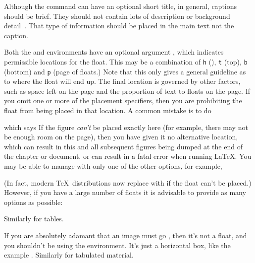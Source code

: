 
Although the  command can have an optional
short title, in general, captions should be brief. They should not
contain lots of description or background detail~\cite{turabian96}.
That type of information should be placed in the main text not the
caption.


\label{obj:positioning}%
Both the 
 and  environments have
an optional argument , which indicates
permissible locations for the float. This may be a combination of
\texttt{h} (), \texttt{t} (top), \texttt{b} (bottom) and
\texttt{p} (page of floats.) Note that this only gives a general
guideline as to where the float will end up. The final location is
governed by other factors, such as space left on the page and the
proportion of text to floats on the page. If you omit one or more of the
placement specifiers, then you are prohibiting the float from being
placed in that location. A common mistake is to do
\begin{alltt}
\wrong{}
\end{alltt}
which says  If the figure \emph{can't} be placed exactly here (for
example, there may not be enough room on the page), then you have
given it no alternative location, which can result in this and all
subsequent figures being dumped at the end of the chapter or
document, or can result in a fatal error when running
\LaTeX{}. You may be
able to manage with only one of the other options, for example,
\begin{alltt}
\end{alltt}
(In fact, modern \TeX\ distributions now replace  with
 if the float can't be placed.)
However, if you have a large number of floats it is advisable to
provide as many options as possible:
\begin{alltt}
\end{alltt}
Similarly for tables.

If you are absolutely adamant that an image must go ,
then it's not a float, and you shouldn't be using the 
 environment. It's just a horizontal box, like the
example . Similarly for
tabulated material.

